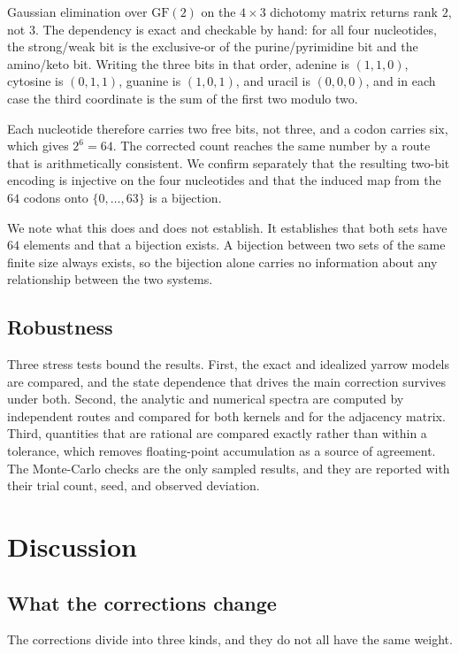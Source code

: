 \documentclass[11pt,a4paper]{article}
\begin{document}
Gaussian elimination over $\mathrm{GF}(2)$ on the $4 \times 3$ dichotomy matrix
returns rank $2$, not $3$. The dependency is exact and checkable by hand: for all
four nucleotides, the strong/weak bit is the exclusive-or of the
purine/pyrimidine bit and the amino/keto bit. Writing the three bits in that
order, adenine is $(1,1,0)$, cytosine is $(0,1,1)$, guanine is $(1,0,1)$, and
uracil is $(0,0,0)$, and in each case the third coordinate is the sum of the
first two modulo two.

Each nucleotide therefore carries two free bits, not three, and a codon carries
six, which gives $2^6 = 64$. The corrected count reaches the same number by a
route that is arithmetically consistent. We confirm separately that the resulting
two-bit encoding is injective on the four nucleotides and that the induced map
from the $64$ codons onto $\{0,\dots,63\}$ is a bijection.

We note what this does and does not establish. It establishes that both sets have
$64$ elements and that a bijection exists. A bijection between two sets of the
same finite size always exists, so the bijection alone carries no information
about any relationship between the two systems.

\subsection{Robustness}

Three stress tests bound the results. First, the exact and idealized yarrow
models are compared, and the state dependence that drives the main correction
survives under both. Second, the analytic and numerical spectra are computed by
independent routes and compared for both kernels and for the adjacency matrix.
Third, quantities that are rational are compared exactly rather than within a
tolerance, which removes floating-point accumulation as a source of agreement.
The Monte-Carlo checks are the only sampled results, and they are reported with
their trial count, seed, and observed deviation.

\section{Discussion}

\subsection{What the corrections change}

The corrections divide into three kinds, and they do not all have the same
weight.
\end{document}
